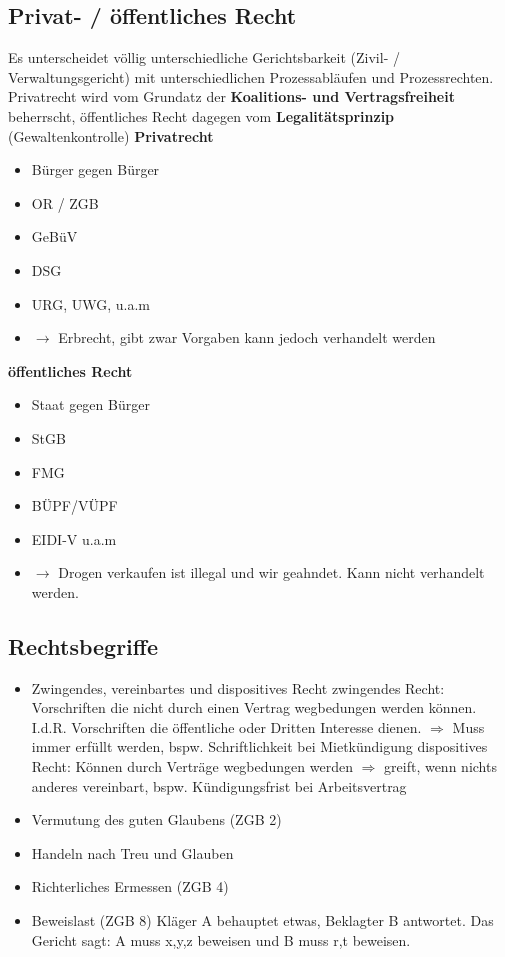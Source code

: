 \documentclass{report}
\theoremstyle{definition}
\theoremstyle{example}
\begin{document}
\subsection{Privat- / öffentliches Recht}
Es unterscheidet völlig unterschiedliche Gerichtsbarkeit (Zivil- / Verwaltungsgericht) mit unterschiedlichen Prozessabläufen und Prozessrechten.\\
Privatrecht wird vom Grundatz der \textbf{Koalitions- und Vertragsfreiheit} beherrscht, öffentliches Recht dagegen vom \textbf{Legalitätsprinzip} (Gewaltenkontrolle)
\textbf{Privatrecht}\\
\begin{itemize}
   \item Bürger gegen Bürger
   \item OR / ZGB
   \item GeBüV
   \item DSG
   \item URG, UWG, u.a.m
   \item $\rightarrow$ Erbrecht, gibt zwar Vorgaben kann jedoch verhandelt werden
\end{itemize}

\textbf{öffentliches Recht}
\begin{itemize}
   \item Staat gegen Bürger
   \item StGB
   \item FMG
   \item BÜPF/VÜPF
   \item EIDI-V u.a.m
   \item $\rightarrow$ Drogen verkaufen ist illegal und wir geahndet. Kann nicht verhandelt werden.
\end{itemize}

\subsection{Rechtsbegriffe}
\begin{itemize}
   \item Zwingendes, vereinbartes und dispositives Recht
   \subitem zwingendes Recht: Vorschriften die nicht durch einen Vertrag wegbedungen werden können. I.d.R. Vorschriften die öffentliche oder Dritten Interesse dienen. $\Rightarrow$ Muss immer erfüllt werden, bspw. Schriftlichkeit bei Mietkündigung
   \subitem dispositives Recht: Können durch Verträge wegbedungen werden $\Rightarrow$ greift, wenn nichts anderes vereinbart, bspw. Kündigungsfrist bei Arbeitsvertrag 
   \item Vermutung des guten Glaubens (ZGB 2)
   \item Handeln nach Treu und Glauben
   \item Richterliches Ermessen (ZGB 4)
   \item Beweislast (ZGB 8)
   \subitem Kläger A behauptet etwas, Beklagter B antwortet. Das Gericht sagt: A muss x,y,z beweisen und B muss r,t beweisen. 
\end{itemize}
\end{document}
